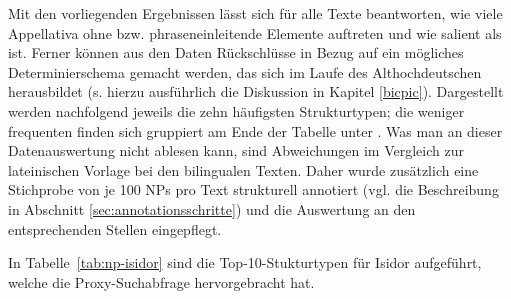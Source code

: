 Mit den vorliegenden Ergebnissen lässt sich für alle Texte beantworten, wie viele Appellativa  ohne  bzw. phraseneinleitende Elemente auftreten und wie salient  als  ist. Ferner können aus den Daten Rückschlüsse in Bezug auf ein mögliches  Determinierschema gemacht werden, das sich im Laufe des Althochdeutschen herausbildet (s. hierzu ausführlich die Diskussion in Kapitel \ref{bicpic}). Dargestellt werden nachfolgend jeweils die zehn häufigsten Strukturtypen; die weniger frequenten finden sich gruppiert am Ende der Tabelle unter .  Was man an dieser Datenauswertung  nicht ablesen kann, sind  Abweichungen im Vergleich zur lateinischen Vorlage bei den bilingualen Texten. Daher wurde zusätzlich eine Stichprobe von je 100 NPs pro Text strukturell annotiert (vgl. die Beschreibung in Abschnitt \ref{sec:annotationsschritte}) und die Auswertung an den entsprechenden Stellen eingepflegt.



In Tabelle~\ref{tab:np-isidor} sind die Top-10-Stukturtypen für Isidor aufgeführt, welche die Proxy-Suchabfrage  hervorgebracht hat. 


